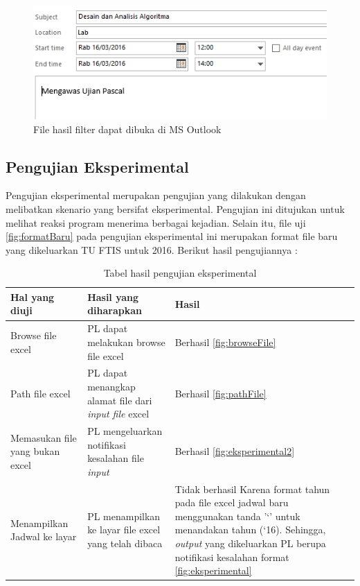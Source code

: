 			\begin{figure}[H]
			\centering
			\includegraphics[scale=0.8]{Gambar/hasilOutlookFilter}
			\caption{File hasil filter dapat dibuka di MS Outlook }
			\label{fig:hasilOutlookFilter}
			\end{figure}
			


\subsection{Pengujian Eksperimental}
Pengujian eksperimental merupakan pengujian yang dilakukan dengan melibatkan skenario yang bersifat eksperimental. Pengujian ini ditujukan untuk melihat reaksi program menerima berbagai kejadian. Selain itu, file uji \ref{fig:formatBaru} pada pengujian eksperimental ini merupakan format file baru yang dikeluarkan TU FTIS untuk 2016. Berikut hasil pengujiannya :
\begin{table}[H]
	\centering
		\caption{Tabel hasil pengujian eksperimental}
		\label{tab:eksperimental}
		\begin{tabular}{ | p{4cm} | p{4cm} | p{4cm} | }
			\hline
				Hal yang diuji & Hasil yang diharapkan & Hasil \\ \hline
				Browse file excel & PL dapat melakukan browse file excel & Berhasil \ref{fig:browseFile}\\ \hline
				Path file excel & PL dapat menangkap alamat file dari \textit{input file} excel & Berhasil \ref{fig:pathFile} \\ \hline
				Memasukan file yang bukan excel & PL mengeluarkan notifikasi kesalahan file \textit{input} & Berhasil \ref{fig:eksperimental2} \\ \hline
				Menampilkan Jadwal ke layar & PL menampilkan ke layar file excel yang telah dibaca & Tidak berhasil Karena format tahun pada file excel jadwal baru menggunakan tanda '`' untuk menandakan tahun (`16). Sehingga, \textit{output} yang dikeluarkan PL berupa notifikasi kesalahan format  \ref{fig:eksperimental} \\ \hline
		\end{tabular}
\end{table}

